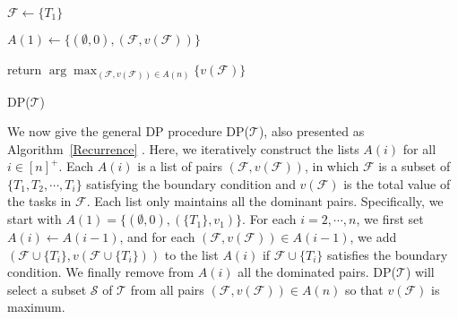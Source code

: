 \documentclass[10pt,journal,compsoc]{IEEEtran}
\begin{document}
\begin{algorithm}
\BlankLine
\BlankLine

$\mathcal{F}\leftarrow\{T_{1}\}$\;

$A(1)\leftarrow \{ (\emptyset, 0), (\mathcal{F}, v(\mathcal{F})) \}$\;

return $\arg\max_{(\mathcal{F}, v(\mathcal{F}))\in A(n)}\{v(\mathcal{F})\}$\;
\caption{DP($\mathcal{T}$)\label{Recurrence}}
\end{algorithm}





We now give the general DP procedure DP($\mathcal{T}$), also presented as Algorithm~\ref{Recurrence} \cite{Williamson}. Here, we iteratively construct the lists $A(i)$ for all $i\in[n]^{+}$. Each $A(i)$ is a list of pairs $(\mathcal{F}, v(\mathcal{F}))$, in which $\mathcal{F}$ is a subset of $\{T_{1}, T_{2}, \cdots, T_{i}\}$ satisfying the boundary condition and $v(\mathcal{F})$ is the total value of the tasks in $\mathcal{F}$. Each list only maintains all the dominant pairs. Specifically, we start with $A(1)=\{(\emptyset, 0), (\{T_{1}\}, v_{1})\}$. For each $i=2,\cdots,n$, we first set $A(i)\leftarrow A(i-1)$, and for each $(\mathcal{F}, v(\mathcal{F}))\in A(i-1)$, we add $(\mathcal{F}\cup\{T_{i}\}, v(\mathcal{F}\cup\{T_{i}\}))$ to the list $A(i)$ if $\mathcal{F}\cup\{T_{i}\}$ satisfies the boundary condition. We finally remove from $A(i)$ all the dominated pairs.
DP($\mathcal{T}$) will select a subset $\mathcal{S}$ of $\mathcal{T}$ from all pairs $(\mathcal{F}, v(\mathcal{F}))\in A(n)$ so that $v(\mathcal{F})$ is maximum.
\end{document}

